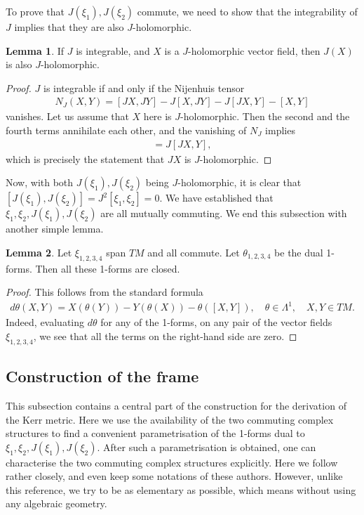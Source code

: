 \documentclass[10pt]{report}
\theoremstyle{definition}
\newtheorem{lemma}{Lemma}[chapter]
\begin{document}
To prove that $J(\xi_1),J(\xi_2)$ commute, we need to show that the integrability of $J$ implies that they are also $J$-holomorphic. 
\begin{lemma} If $J$ is integrable, and $X$ is a $J$-holomorphic vector field, then $J(X)$ is also $J$-holomorphic.
\end{lemma} 
\begin{proof}
$J$ is integrable if and only if the Nijenhuis tensor 
\begin{align}
N_J(X,Y) = [JX,JY]-J[X,JY]-J[JX,Y]-[X,Y] \label{eq:nijenhuis-tensor}
\end{align}
vanishes. Let us assume that $X$ here is $J$-holomorphic. Then the second and the fourth terms annihilate each other, and the vanishing of $N_J$ implies
\begin{align}
[JX,JY]=J[JX,Y],
\end{align}
which is precisely the statement that $JX$ is $J$-holomorphic.
\end{proof}

Now, with both $J(\xi_1),J(\xi_2)$ being $J$-holomorphic, it is clear that $[J(\xi_1),J(\xi_2)]=J^2 [\xi_1,\xi_2]=0$. We have established that $\xi_1,\xi_2,J(\xi_1),J(\xi_2)$ are all mutually commuting. We end this subsection with another simple lemma.
\begin{lemma}
    Let $\xi_{1,2,3,4}$ span $TM$ and all commute. Let $\theta_{1,2,3,4}$ be the dual 1-forms. Then all these 1-forms are closed. 
\end{lemma}
\begin{proof}This follows from the standard formula
    \begin{align}
        d\theta(X,Y) = X(\theta(Y)) - Y(\theta(X)) - \theta([X,Y]), \quad \theta \in \Lambda^1, \quad X,Y \in TM.
    \end{align}
    Indeed, evaluating $d\theta$ for any of the 1-forms, on any pair of the vector fields $\xi_{1,2,3,4}$, we see that all the terms on the right-hand side are zero.  
   \end{proof}
   
\subsection{Construction of the frame}

This subsection contains a central part of the construction for the derivation of the Kerr metric. Here we use the availability of the two commuting complex structures to find a convenient parametrisation of the 1-forms dual to $\xi_1,\xi_2,J(\xi_1),J(\xi_2)$. After such a parametrisation is obtained, one can characterise the two commuting complex structures explicitly. Here we follow~\cite{AmbitoricGeomeAposto2013} rather closely, and even keep some notations of these authors. However, unlike this reference, we try to be as elementary as possible, which means without using any algebraic geometry.
\end{document}
